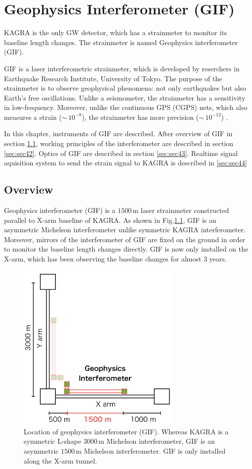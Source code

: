 \chapter{Geophysics Interferometer (GIF)} \label{chap3}
KAGRA is the only GW detector, which has a strainmeter to monitor its baseline length changes. The strainmeter is named Geophysics interferometer (GIF).

GIF is a laser interferometric strainmeter, which is developed by reserchers in Earthquake Research Institute, University of Tokyo. The purpose of the strainmeter is to observe geophysical phenomena: not only earthquakes but also Earth's free oscillations. Unlike a seismometer, the strainmeter has a sensitivity in low-frequency. Moreover, unlike the continuous GPS (CGPS) nets, which also measures a strain ($\sim\,10^{-8}$), the strainmeter has more precision ($\sim\,10^{-12}$) \cite{araya2007broadband}.

In this chapter, instruments of GIF are described. After overview of GIF in section \cref{sec:sec41}, working principles of the interferometer are described in section \cref{sec:sec42}. Optics of GIF are described in section \cref{sec:sec43}. Realtime signal aquisition system to send the strain signal to KAGRA is described in \cref{sec:sec44}

\section{Overview} \label{sec:sec41}
Geophysics interferometer (GIF) is a $1500\,\mathrm{m}$ laser strainmeter constructed parallel to X-arm baseline of KAGRA. As shown in Fig.\ref{img:img402}, GIF is an asymmetric Michelson interferometer unlike symmetric KAGRA interferometer. Moreover, mirrors of the interferometer of GIF are fixed on the ground in order to monitor the baseline length changes directly. GIF is now only installed on the X-arm, which has been observing the baseline changes for almost 3 years.
\begin{figure}[h]
  \centering
  \includegraphics[width=8cm]{./img_chap4/img402.png}
  \caption{Location of geophysics interferometer (GIF). Whereas KAGRA is a symmetric L-shape $3000\,\mathrm{m}$ Michelson interferometer, GIF is an asymmetric $1500\,\mathrm{m}$ Michelson interferometer. GIF is only installed along the X-arm tunnel.} \label{img:img402}
\end{figure}


